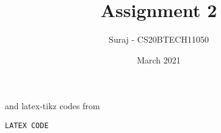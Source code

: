\documentclass[journal,12pt,twocolumn]{IEEEtran}
\date{March 2021}
\DeclareMathOperator*{\Res}{Res}
\begin{document}
\newcommand{\BEQA}{\begin{eqnarray}}
\newcommand{\EEQA}{\end{eqnarray}}
\newcommand{\define}{\stackrel{\triangle}{=}}

\raggedbottom
\setlength{\parindent}{0pt}
\providecommand{\mbf}{\mathbf}
\providecommand{\pr}[1]{\ensuremath{\Pr\left(#1\right)}}
\providecommand{\qfunc}[1]{\ensuremath{Q\left(#1\right)}}
\providecommand{\fn}[1]{\ensuremath{f\left(#1\right)}}
\providecommand{\e}[1]{\ensuremath{E\left(#1\right)}}
\providecommand{\sbrak}[1]{\ensuremath{{}\left[#1\right]}}
\providecommand{\lsbrak}[1]{\ensuremath{{}\left[#1\right.}}
\providecommand{\rsbrak}[1]{\ensuremath{{}\left.#1\right]}}
\providecommand{\brak}[1]{\ensuremath{\left(#1\right)}}
\providecommand{\lbrak}[1]{\ensuremath{\left(#1\right.}}
\providecommand{\rbrak}[1]{\ensuremath{\left.#1\right)}}
\providecommand{\cbrak}[1]{\ensuremath{\left\{#1\right\}}}
\providecommand{\lcbrak}[1]{\ensuremath{\left\{#1\right.}}
\providecommand{\rcbrak}[1]{\ensuremath{\left.#1\right\}}}
\theoremstyle{remark}
\newtheorem{rem}{Remark}
\newcommand{\sgn}{\mathop{\mathrm{sgn}}}
\providecommand{\abs}[1]{\vert#1\vert}
\providecommand{\res}[1]{\Res\displaylimits_{#1}} 
\providecommand{\norm}[1]{\lVert#1\rVert}
\providecommand{\mtx}[1]{\mathbf{#1}}
\providecommand{\mean}[1]{E[ #1 ]}
\providecommand{\fourier}{\overset{\mathcal{F}}{ \rightleftharpoons}}
\providecommand{\system}{\overset{\mathcal{H}}{ \longleftrightarrow}}
\newcommand{\solution}{\noindent \textbf{Solution: }}
\newcommand{\Int}{\int\limits}
\newcommand{\cosec}{\,\text{cosec}\,}
\providecommand{\dec}[2]{\ensuremath{\overset{#1}{\underset{#2}{\gtrless}}}}
\newcommand{\myvec}[1]{\ensuremath{\begin{pmatrix}#1\end{pmatrix}}}
\newcommand{\mydet}[1]{\ensuremath{\begin{vmatrix}#1\end{vmatrix}}}
\makeatletter
\vspace{3cm}
\title{Assignment 2}
\author{Suraj - CS20BTECH11050}
\maketitle
\newpage
\bigskip
\renewcommand{\thetable}{\theenumi}

and latex-tikz codes from 
%
\begin{lstlisting}
LATEX CODE
\end{lstlisting}
\end{document}
